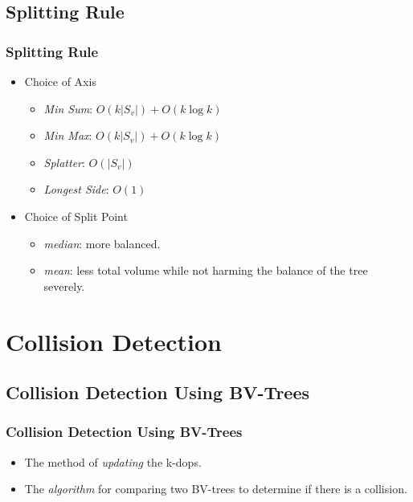 \documentclass{beamer}
\begin{document}
\subsection{Splitting Rule}
	\begin{frame}
	\frametitle{Splitting Rule}
		\begin{itemize}
			\item Choice of Axis
			\begin{itemize}
				\item {\it Min Sum}: $O(k|S_{v}|)+O(k\log k)$
				\item {\it Min Max}: $O(k|S_{v}|)+O(k\log k)$
				\item {\it Splatter}: $O(|S_{v}|)$
				\item {\it Longest Side}: $O(1)$
			\end{itemize}
			\item Choice of Split Point
			\begin{itemize}
				\item {\it median}: more balanced.
				\item {\it mean}: less total volume while not harming the balance of the tree severely.
			\end{itemize}
		\end{itemize}
	\end{frame}

\section{Collision Detection}

\subsection{Collision Detection Using BV-Trees}
	\begin{frame}
	\frametitle{Collision Detection Using BV-Trees}
		\begin{itemize}
			\item The method of {\it updating} the k-dops.
			\item The {\it algorithm} for comparing two BV-trees to determine if there is a collision.
		\end{itemize}
	\end{frame}

\end{document}
